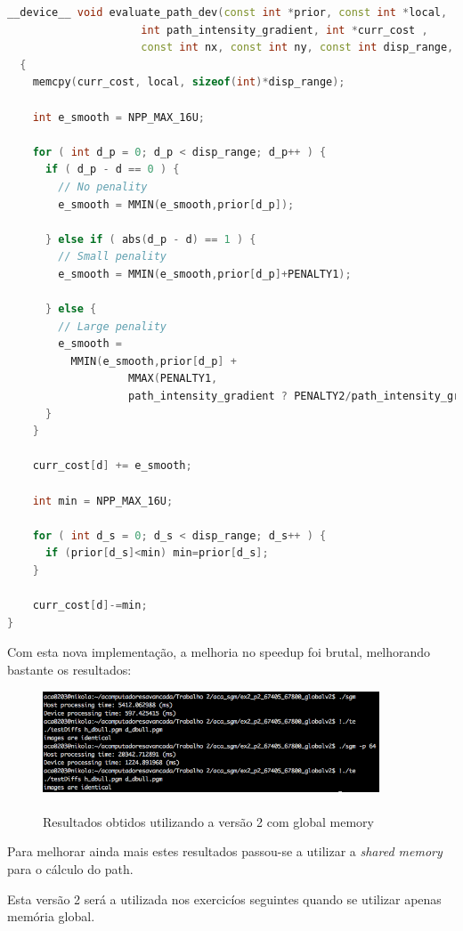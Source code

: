 \documentclass[pdftex,12pt,a4paper]{report}
\begin{document}
  \begin{lstlisting}[language=c++, basicstyle=\scriptsize]
__device__ void evaluate_path_dev(const int *prior, const int *local,
                     int path_intensity_gradient, int *curr_cost ,
                     const int nx, const int ny, const int disp_range, const int d)
  {
    memcpy(curr_cost, local, sizeof(int)*disp_range);
    
    int e_smooth = NPP_MAX_16U;
    
    for ( int d_p = 0; d_p < disp_range; d_p++ ) {
      if ( d_p - d == 0 ) {
        // No penality
        e_smooth = MMIN(e_smooth,prior[d_p]);
        
      } else if ( abs(d_p - d) == 1 ) {
        // Small penality
        e_smooth = MMIN(e_smooth,prior[d_p]+PENALTY1);
        
      } else {
        // Large penality
        e_smooth =
          MMIN(e_smooth,prior[d_p] +
                   MMAX(PENALTY1,
                   path_intensity_gradient ? PENALTY2/path_intensity_gradient : PENALTY2));
      }
    }

    curr_cost[d] += e_smooth;

    int min = NPP_MAX_16U;
    
    for ( int d_s = 0; d_s < disp_range; d_s++ ) {
      if (prior[d_s]<min) min=prior[d_s];
    }
    
    curr_cost[d]-=min;
}

\end{lstlisting} 

Com esta nova implementação, a melhoria no speedup foi brutal, melhorando bastante os resultados:

\begin{figure}[!htb]
\center
 \includegraphics[width=100mm,scale=1]{IteratePositionsV2.png}
 \caption{\\ Resultados obtidos utilizando a versão 2 com global memory}
 \label{fig:IteratePositionsV2}
\end{figure}

Para melhorar ainda mais estes resultados passou-se a utilizar a \textit{shared memory} para o cálculo do path.

Esta versão 2 será a utilizada nos exercicíos seguintes quando se utilizar apenas memória global.
\end{document}
